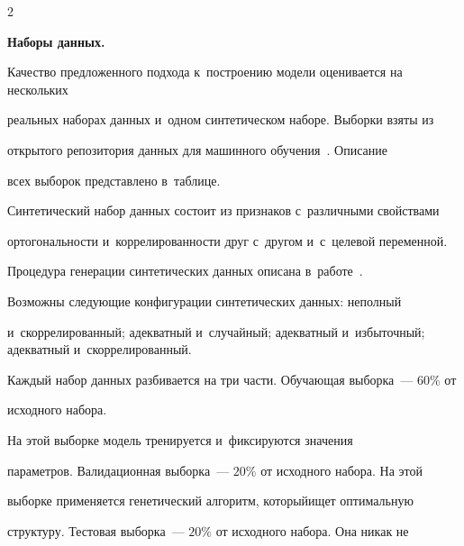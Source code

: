 \begin{multicols}{2}
\begin{figure}[b]
\vspace*{-11pt}




\label{fig:blobs}


\end{figure}











\textbf{Наборы данных.}


Качество предложенного подхода к~построению модели оценивается на нескольких 


реальных наборах данных и~одном синтетическом наборе. Выборки взяты из 


открытого \mbox{репозитория} данных для машинного обучения~\cite{seventh}.  Описание 


всех выборок представлено в~таблице. %


Синтетический набор данных состоит из признаков с~различными свойствами 


ортогональности и~коррелированности друг с~другом и~с~целевой переменной. 


Процедура генерации синтетических данных описана в~работе~\cite{first}. 


Возможны следующие конфигурации синтетических данных: неполный 


и~скоррелированный; адекватный и~случайный; адекватный и~избыточный; адекватный и~скоррелированный.





Каждый набор данных разбивается на три час\-ти. Обучающая выборка~--- $60\%$ от 


исходного набора.\linebreak


 На этой выборке модель тренируется и~фиксируются значения 


параметров. Валидационная выборка~--- $20\%$ от исходного набора. На этой 


выборке применяется генетический алгоритм, который\linebreak ищет оптимальную 


структуру. Тестовая выборка~--- $20\%$ от исходного набора. Она никак не 



\end{multicols}
